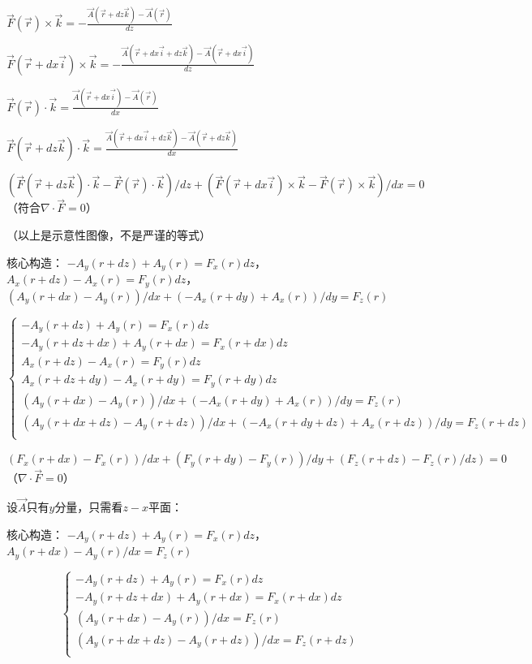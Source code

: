 $\vec{F}(\vec{r})\times\vec{k}=-\frac{\vec{A}(\vec{r}+dz\vec{k})-\vec{A}(\vec{r})}{dz}$

$\vec{F}(\vec{r}+dx\vec{i})\times\vec{k}=-\frac{\vec{A}(\vec{r}+dx\vec{i}+dz\vec{k})-\vec{A}(\vec{r}+dx\vec{i})}{dz}$

$\vec{F}(\vec{r})\cdot\vec{k}=\frac{\vec{A}(\vec{r}+dx\vec{i})-\vec{A}(\vec{r})}{dx}$

$\vec{F}(\vec{r}+dz\vec{k})\cdot\vec{k}=\frac{\vec{A}(\vec{r}+dx\vec{i}+dz\vec{k})-\vec{A}(\vec{r}+dz\vec{k})}{dx}$

$(\vec{F}(\vec{r}+dz\vec{k})\cdot\vec{k}-\vec{F}(\vec{r})\cdot\vec{k})/dz+(\vec{F}(\vec{r}+dx\vec{i})\times\vec{k}-\vec{F}(\vec{r})\times\vec{k})/dx=0$
（符合$\nabla \cdot \vec{F}=0$）

（以上是示意性图像，不是严谨的等式）

\bigskip
\bigskip
\bigskip

核心构造：
$-A_y(r+dz)+A_y(r)=F_x(r)dz$，
$A_x(r+dz)-A_x(r)=F_y(r)dz$，
$(A_y(r+dx)-A_y(r))/dx+(-A_x(r+dy)+A_x(r))/dy=F_z(r)$

\[
\begin{cases}
-A_y(r+dz)+A_y(r)=F_x(r)dz\\

-A_y(r+dz+dx)+A_y(r+dx)=F_x(r+dx)dz\\

A_x(r+dz)-A_x(r)=F_y(r)dz\\

A_x(r+dz+dy)-A_x(r+dy)=F_y(r+dy)dz\\

(A_y(r+dx)-A_y(r))/dx+(-A_x(r+dy)+A_x(r))/dy=F_z(r)\\

(A_y(r+dx+dz)-A_y(r+dz))/dx+(-A_x(r+dy+dz)+A_x(r+dz))/dy=F_z(r+dz)\\
\end{cases}
\]

$(F_x(r+dx)-F_x(r))/dx+(F_y(r+dy)-F_y(r))/dy+(F_z(r+dz)-F_z(r)/dz)=0$
（$\nabla \cdot \vec{F}=0$）

设$\vec{A}$只有$y$分量，只需看$z-x$平面：

核心构造：
$-A_y(r+dz)+A_y(r)=F_x(r)dz$，
$A_y(r+dx)-A_y(r)/dx=F_z(r)$

\[
\begin{cases}
-A_y(r+dz)+A_y(r)=F_x(r)dz\\

-A_y(r+dz+dx)+A_y(r+dx)=F_x(r+dx)dz\\

(A_y(r+dx)-A_y(r))/dx=F_z(r)\\

(A_y(r+dx+dz)-A_y(r+dz))/dx=F_z(r+dz)\\
\end{cases}
\]

